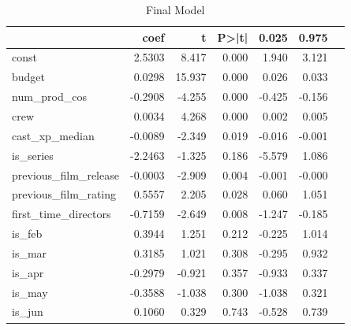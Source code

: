 \documentclass[10pt]{article}
\begin{document}
\begin{table}[H]
\centering
  \begin{threeparttable}
  \scriptsize
    \caption{Final Model}
	\begin{tabular}{lrrrrrr}
	\toprule
	                                    & coef & t & P>|t| & 0.025 & 0.975 \\
		\midrule
		const                        &       2.5303       &     8.417  &         0.000        &        1.940    &        3.121     \\
		budget                       &       0.0298       &    15.937  &         0.000        &        0.026    &        0.033     \\
		num\_prod\_cos   &      -0.2908       &    -4.255  &         0.000        &       -0.425    &       -0.156     \\
		crew                         &       0.0034       &     4.268  &         0.000        &        0.002    &        0.005     \\
		cast\_xp\_median             &      -0.0089       &    -2.349  &         0.019        &       -0.016    &       -0.001     \\
		is\_series                   &      -2.2463       &    -1.325  &         0.186        &       -5.579    &        1.086     \\
		previous\_film\_release      &      -0.0003       &    -2.909  &         0.004        &       -0.001    &       -0.000     \\
		previous\_film\_rating       &       0.5557      &     2.205  &         0.028        &        0.060    &        1.051     \\
		first\_time\_directors       &      -0.7159       &    -2.649  &         0.008        &       -1.247    &       -0.185     \\
		is\_feb                      &       0.3944       &     1.251  &         0.212        &       -0.225    &        1.014     \\
		is\_mar                      &       0.3185       &     1.021  &         0.308        &       -0.295    &        0.932     \\
		is\_apr                      &      -0.2979       &    -0.921  &         0.357        &       -0.933    &        0.337     \\
		is\_may                      &      -0.3588       &    -1.038  &         0.300        &       -1.038    &        0.321     \\
		is\_jun                      &       0.1060       &     0.329  &         0.743        &       -0.528    &        0.739     \\

\end{tabular}
\end{threeparttable}
\end{table}
\end{document}
